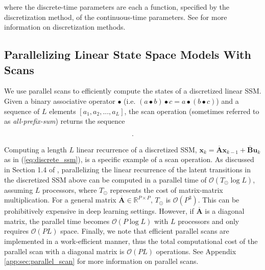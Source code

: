 where the discrete-time parameters are each a function, specified by the discretization method, of the continuous-time parameters.  See \citet{iserles2009first} for more information on discretization methods.  

\subsection{Parallelizing Linear State Space Models With Scans}
\label{subsec:parscan}
We use parallel scans to efficiently compute the states of a discretized linear SSM.  Given a binary associative operator $\bullet$ (i.e. $(a \bullet b) \bullet c = a \bullet (b \bullet c)$) and a sequence of $L$ elements $[a_1, a_2, ..., a_{L}]$, the scan operation (sometimes referred to as \emph{all-prefix-sum}) returns the sequence

\begin{align}
    [a_1, \ (a_1 \bullet a_2), \ ..., \ (a_1 \bullet a_2 \bullet ... \bullet a_{L})].
\end{align}

Computing a length $L$ linear recurrence of a discretized SSM, $\mathbf{x}_k = \overline{\mathbf{A}}\mathbf{x}_{k-1} + \overline{\mathbf{B}}\mathbf{u}_k$ as in (\ref{eq:discrete_ssm}), is a specific example of a scan operation.  As discussed in  Section 1.4 of \citet{blelloch1990prefix}, parallelizing the linear recurrence of the latent transitions in the discretized SSM above can be computed in a parallel time of $\mathcal{O}(T_{\odot}\log L)$, assuming $L$ processors, where $T_{\odot}$ represents the cost of matrix-matrix multiplication. For a general matrix $\overline{\mathbf{A}}\in \mathbb{R}^{P \times P}$, $T_\odot$ is $\mathcal{O}(P^3)$.  This can be prohibitively expensive in deep learning settings. However, if $\overline{\mathbf{A}}$ is a diagonal matrix, the parallel time becomes $\mathcal{O}(P \log L)$ with $L$ processors and only requires $\mathcal{O}(PL)$ space. Finally, we note that efficient parallel scans are implemented in a work-efficient manner, thus the total computational cost of the parallel scan with a diagonal matrix is $\mathcal{O}(PL)$ operations. See Appendix \ref{app:sec:parallel_scan} for more information on parallel scans.

